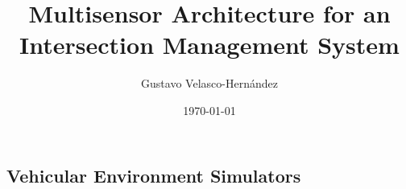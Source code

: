 \documentclass{book}
\begin{document}
\title{Multisensor Architecture for an Intersection Management System}
\vfill
\vfill
\vfill
\author{Gustavo Velasco-Hernández}
\vfill
\vfill
\vfill
\date{\today}
\maketitle

\tableofcontents
\setcounter{tocdepth}{3}

\listoffigures

\listoftables

















\begin{appendices}
	\chapter {Vehicular Environment Simulators}
	
\end{appendices}



%
\end{document}
